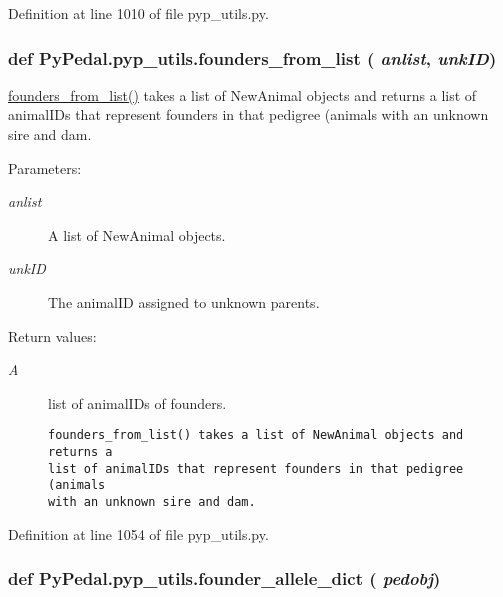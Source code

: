 Definition at line 1010 of file pyp\_\-utils.py.\hypertarget{namespacePyPedal_1_1pyp__utils_6dfbe8b07bcf8642a234d9e37ac1d475}{
\subsubsection[founders\_\-from\_\-list]{\setlength{\rightskip}{0pt plus 5cm}def Py\-Pedal.pyp\_\-utils.founders\_\-from\_\-list ( {\em anlist},  {\em unk\-ID})}}
\label{namespacePyPedal_1_1pyp__utils_6dfbe8b07bcf8642a234d9e37ac1d475}


\hyperlink{namespacePyPedal_1_1pyp__utils_6dfbe8b07bcf8642a234d9e37ac1d475}{founders\_\-from\_\-list()} takes a list of New\-Animal objects and returns a list of animal\-IDs that represent founders in that pedigree (animals with an unknown sire and dam. 

\begin{Desc}
\item[Parameters:]
\begin{description}
\item[{\em anlist}]A list of New\-Animal objects. \item[{\em unk\-ID}]The animal\-ID assigned to unknown parents. \end{description}
\end{Desc}
\begin{Desc}
\item[Return values:]
\begin{description}
\item[{\em A}]list of animal\-IDs of founders.

\footnotesize\begin{verbatim}founders_from_list() takes a list of NewAnimal objects and returns a
list of animalIDs that represent founders in that pedigree (animals
with an unknown sire and dam.
\end{verbatim}
\normalsize
 \end{description}
\end{Desc}


Definition at line 1054 of file pyp\_\-utils.py.\hypertarget{namespacePyPedal_1_1pyp__utils_571a7b0f820ad19e66b570ec6a11fd30}{
\subsubsection[founder\_\-allele\_\-dict]{\setlength{\rightskip}{0pt plus 5cm}def Py\-Pedal.pyp\_\-utils.founder\_\-allele\_\-dict ( {\em pedobj})}}
\label{namespacePyPedal_1_1pyp__utils_571a7b0f820ad19e66b570ec6a11fd30}


